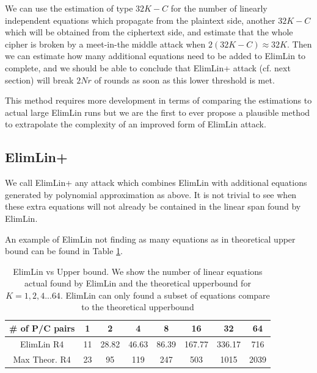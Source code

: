 \begin{conj}
We can use the estimation of type $32K-C$ for the number of linearly independent equations 
which propagate from the plaintext side, another $32K-C$ which will be obtained from the ciphertext side, 
and estimate that the whole cipher is broken by a meet-in-the middle attack when $2(32K-C)\approx 32K$. 
Then we can estimate how many additional equations need to be added to ElimLin to complete, 
and we should be able to conclude that ElimLin+ attack (cf. next section) 
will break $2Nr$ of rounds as soon as this lower threshold is met. 

This method requires more development in terms of comparing the estimations to actual large ElimLin runs 
but we are the first to ever propose a plausible method to extrapolate the complexity of an improved 
form of ElimLin attack. 
\end{conj}

\subsection{ElimLin+}
We call ElimLin+ any attack which combines ElimLin with additional equations generated by polynomial approximation as above. It is not trivial to see when these extra equations will not already be contained in the linear span found by ElimLin.

An example of ElimLin not finding as many equations as in theoretical upper bound can be found in Table \ref{tab:ElimLinVsUpperBound}.
\begin{table}[h!]
	\centering
	\caption[ElimLin vs Upper bound]{ElimLin vs Upper bound. We show the number of linear equations actual found by ElimLin and the theoretical upperbound for $K = 1,2,4 ... 64$. ElimLin can only found a subset of equations compare to the theoretical upperbound}
	\label{tab:ElimLinVsUpperBound}
	\begin{tabular}{|c|c|c|c|c|c|c|c|}
		\hline
		\# of P/C pairs& 1 &	2	& 4 &	8	& 16	& 32	&  64 \\ \hline
		ElimLin R4    & 11 & 28.82 & 46.63 & 86.39 & 167.77 & 336.17 & 716  \\ \hline
		Max Theor. R4 & 23 & 95    & 119   & 247   & 503    & 1015   & 2039 \\ \hline
	\end{tabular}
\end{table}

